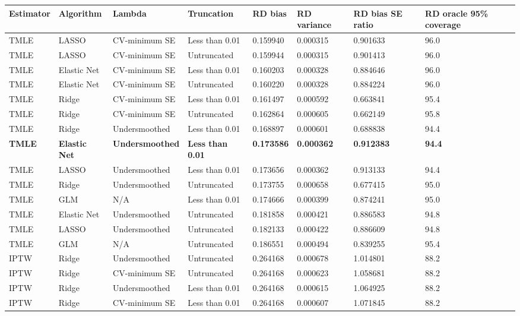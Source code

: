 
\begin{longtable}[l]{llllllll}
\toprule
Estimator & Algorithm & Lambda & Truncation & RD bias & RD variance & RD bias SE ratio & RD oracle 95\% coverage\\
\midrule
TMLE & LASSO & CV-minimum SE & Less than 0.01 & 0.159940 & 0.000315 & 0.901633 & 96.0\\
TMLE & LASSO & CV-minimum SE & Untruncated & 0.159944 & 0.000315 & 0.901413 & 96.0\\
TMLE & Elastic Net & CV-minimum SE & Less than 0.01 & 0.160203 & 0.000328 & 0.884646 & 96.0\\
TMLE & Elastic Net & CV-minimum SE & Untruncated & 0.160220 & 0.000328 & 0.884224 & 96.0\\
TMLE & Ridge & CV-minimum SE & Less than 0.01 & 0.161497 & 0.000592 & 0.663841 & 95.4\\
TMLE & Ridge & CV-minimum SE & Untruncated & 0.162864 & 0.000605 & 0.662149 & 95.8\\
TMLE & Ridge & Undersmoothed & Less than 0.01 & 0.168897 & 0.000601 & 0.688838 & 94.4\\
\midrule
\textbf{TMLE} & \textbf{Elastic Net} & \textbf{Undersmoothed} & \textbf{Less than 0.01} & \textbf{0.173586} & \textbf{0.000362} & \textbf{0.912383} & \textbf{94.4}\\
\midrule
TMLE & LASSO & Undersmoothed & Less than 0.01 & 0.173656 & 0.000362 & 0.913133 & 94.4\\
TMLE & Ridge & Undersmoothed & Untruncated & 0.173755 & 0.000658 & 0.677415 & 95.0\\
TMLE & GLM & N/A & Less than 0.01 & 0.174666 & 0.000399 & 0.874241 & 95.0\\
TMLE & Elastic Net & Undersmoothed & Untruncated & 0.181858 & 0.000421 & 0.886583 & 94.8\\
TMLE & LASSO & Undersmoothed & Untruncated & 0.182133 & 0.000422 & 0.886609 & 94.8\\
TMLE & GLM & N/A & Untruncated & 0.186551 & 0.000494 & 0.839255 & 95.4\\
IPTW & Ridge & Undersmoothed & Untruncated & 0.264168 & 0.000678 & 1.014801 & 88.2\\
IPTW & Ridge & CV-minimum SE & Untruncated & 0.264168 & 0.000623 & 1.058681 & 88.2\\
IPTW & Ridge & Undersmoothed & Less than 0.01 & 0.264168 & 0.000615 & 1.064925 & 88.2\\
IPTW & Ridge & CV-minimum SE & Less than 0.01 & 0.264168 & 0.000607 & 1.071845 & 88.2\\

\end{longtable}
